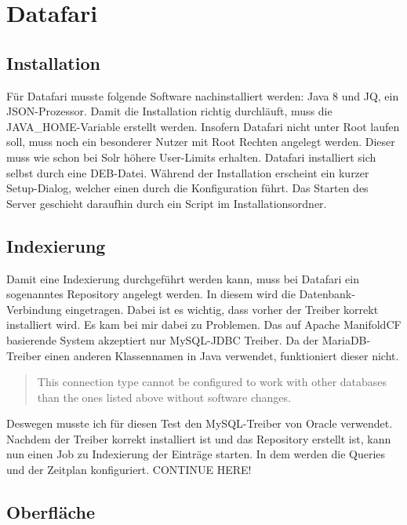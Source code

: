 
\section{Datafari}

\subsection{Installation}

Für Datafari musste folgende Software nachinstalliert werden: Java 8 und JQ, ein JSON-Prozessor. Damit die Installation richtig durchläuft, muss die JAVA\_HOME-Variable erstellt werden. Insofern Datafari nicht unter Root laufen soll, muss noch ein besonderer Nutzer mit Root Rechten angelegt werden. Dieser muss wie schon bei Solr höhere User-Limits erhalten. Datafari installiert sich selbst durch eine DEB-Datei. Während der Installation erscheint ein kurzer Setup-Dialog, welcher einen durch die Konfiguration führt. Das Starten des Server geschieht daraufhin durch ein Script im Installationsordner.

\subsection{Indexierung}

Damit eine Indexierung durchgeführt werden kann, muss bei Datafari ein sogenanntes Repository angelegt werden. In diesem wird die Datenbank-Verbindung eingetragen. Dabei ist es wichtig, dass vorher der Treiber korrekt installiert wird. Es kam bei mir dabei zu Problemen. 
Das auf Apache ManifoldCF basierende System akzeptiert nur MySQL-JDBC Treiber. Da der MariaDB-Treiber einen anderen Klassennamen in Java verwendet, funktioniert dieser nicht. \begin{quote} This connection type cannot be configured to work with other databases than the ones listed above without software changes.~\cite[S.~61]{ApacheSoftwareFoundation.}\end{quote} Deswegen musste ich für diesen Test den MySQL-Treiber von Oracle verwendet.
Nachdem der Treiber korrekt installiert ist und das Repository erstellt ist, kann nun einen Job zu Indexierung der Einträge starten. In dem werden die Queries und der Zeitplan konfiguriert.
CONTINUE HERE!

\subsection{Oberfläche}

